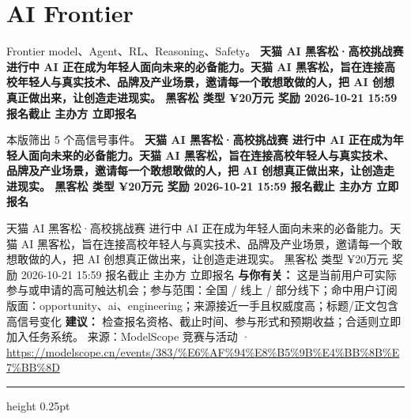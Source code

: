 \documentclass[10.5pt]{ctexart}
\begin{document}
\section*{AI Frontier}
{\color{ormuted} Frontier model、Agent、RL、Reasoning、Safety。}
\vspace{2mm}
{\LARGE\bfseries 天猫 AI 黑客松·高校挑战赛 进行中 AI 正在成为年轻人面向未来的必备能力。天猫 AI 黑客松，旨在连接高校年轻人与真实技术、品牌及产业场景，邀请每一个敢想敢做的人，把 AI 创想真正做出来，让创造走进现实。 黑客松 类型 ¥20万元 奖励 2026-10-21 15:59 报名截止 主办方 立即报名}\par
\vspace{1mm}
{\color{ormuted} 本版筛出 5 个高信号事件。}
\vspace{3mm}
{\Large\bfseries 天猫 AI 黑客松·高校挑战赛 进行中 AI 正在成为年轻人面向未来的必备能力。天猫 AI 黑客松，旨在连接高校年轻人与真实技术、品牌及产业场景，邀请每一个敢想敢做的人，把 AI 创想真正做出来，让创造走进现实。 黑客松 类型 ¥20万元 奖励 2026-10-21 15:59 报名截止 主办方 立即报名}\par
天猫 AI 黑客松·高校挑战赛 进行中 AI 正在成为年轻人面向未来的必备能力。天猫 AI 黑客松，旨在连接高校年轻人与真实技术、品牌及产业场景，邀请每一个敢想敢做的人，把 AI 创想真正做出来，让创造走进现实。 黑客松 类型 ¥20万元 奖励 2026-10-21 15:59 报名截止 主办方 立即报名
\textbf{与你有关：} 这是当前用户可实际参与或申请的高可触达机会；参与范围：全国 / 线上 / 部分线下；命中用户订阅版面：opportunity、ai、engineering；来源接近一手且权威度高；标题/正文包含高信号变化
\textbf{建议：} 检查报名资格、截止时间、参与形式和预期收益；合适则立即加入任务系统。
{\footnotesize\color{ormuted} 来源：ModelScope 竞赛与活动 · \url{https://modelscope.cn/events/383/%E6%AF%94%E8%B5%9B%E4%BB%8B%E7%BB%8D}}
\vspace{4mm}
\hrule height 0.25pt
\vspace{3mm}
\end{document}

